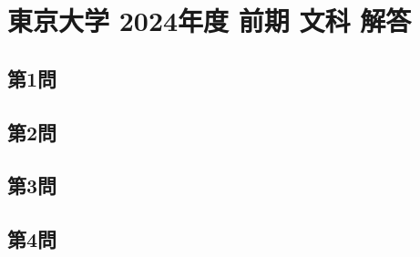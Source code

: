 ﻿\documentclass[../../uem_tok_a.tex]{subfiles}
\begin{document}
    \section{東京大学 2024年度 前期 文科 解答}

    \subsection{第1問}
    

    \clearpage
    \subsection{第2問}
    

    \clearpage
    \subsection{第3問}
    

    \clearpage
    \subsection{第4問}
    

    \clearpage
\end{document}
